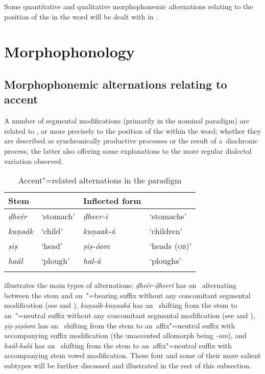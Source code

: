 Some quantitative and qualitative morphophonemic alternations relating to the position of the  in the word will be dealt with in .


\section[Morphophonology]{Morphophonology{\protect\footnotemark}}
\label{sec:3-5}


\subsection{Morphophonemic alternations relating to accent}
\label{subsec:3-5-1}

A number of segmental modifications (primarily in the nominal paradigm) are related to , or more precisely to the position of the  within the word; whether they are described as synchronically productive processes or the result of a~diachronic process, the latter also offering some explanations to the more regular dialectal variation observed. 


\begin{table}[ht]
\caption{ Accent"=related alternations in the paradigm}
\begin{tabularx}{\textwidth}{ l@{\hspace{30pt}} Q Q Q }
\lsptoprule
Stem &
&
Inflected form &
\\\hline
\textit{ḍheér} &
`stomach' &
\textit{ḍheer-í} &
`stomachs'\\
\textit{kuṇaák} &
`child' &
\textit{kuṇaak-á} &
`children'\\
\textit{ṣiṣ} &
`head' &
\textit{ṣiṣ-óom} &
`heads (\textsc{ob)}'\\
\textit{haál} &
`plough' &
\textit{hal-á} &
`ploughs'\\\lspbottomrule
\end{tabularx}
\label{tab:3-7}
\end{table}


 illustrates the main types of alternations: \textit{ḍheér-ḍheerí} has an~ alternating between the stem and an~"=bearing suffix without any concomitant segmental modification (see  and ), \textit{kuṇaák-kuṇaaká} has an~ shifting from the stem to an~"=neutral suffix without any concomitant segmental modification (see  and ), \textit{ṣiṣ-ṣiṣóom} has an~ shifting from the stem to an~affix"=neutral suffix with accompanying suffix modification (the unaccented allomorph being \textit{-am}), and \textit{haál-halá} has an~ shifting from the stem to an~affix"=neutral suffix with accompanying stem vowel modification. These four and some of their more salient subtypes will be further discussed and illustrated in the rest of this subsection.


